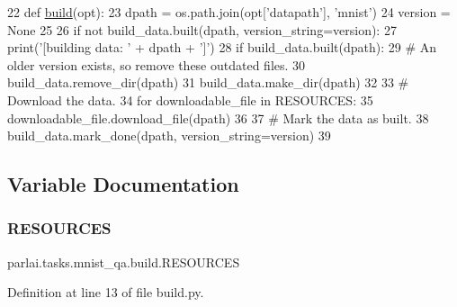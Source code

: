\begin{DoxyCode}
22 \textcolor{keyword}{def }\hyperlink{namespacedialog__babi__feedback_1_1build_a7a9d289f7493a5ded13c4b7f071b6184}{build}(opt):
23     dpath = os.path.join(opt[\textcolor{stringliteral}{'datapath'}], \textcolor{stringliteral}{'mnist'})
24     version = \textcolor{keywordtype}{None}
25 
26     \textcolor{keywordflow}{if} \textcolor{keywordflow}{not} build\_data.built(dpath, version\_string=version):
27         print(\textcolor{stringliteral}{'[building data: '} + dpath + \textcolor{stringliteral}{']'})
28         \textcolor{keywordflow}{if} build\_data.built(dpath):
29             \textcolor{comment}{# An older version exists, so remove these outdated files.}
30             build\_data.remove\_dir(dpath)
31         build\_data.make\_dir(dpath)
32 
33         \textcolor{comment}{# Download the data.}
34         \textcolor{keywordflow}{for} downloadable\_file \textcolor{keywordflow}{in} RESOURCES:
35             downloadable\_file.download\_file(dpath)
36 
37         \textcolor{comment}{# Mark the data as built.}
38         build\_data.mark\_done(dpath, version\_string=version)
39 \end{DoxyCode}


\subsection{Variable Documentation}
\mbox{\label{namespaceparlai_1_1tasks_1_1mnist__qa_1_1build_a4a925172348e79b08c74a079d215d1fc}} 
\subsubsection{\texorpdfstring{R\+E\+S\+O\+U\+R\+C\+ES}{RESOURCES}}
{\footnotesize\ttfamily parlai.\+tasks.\+mnist\+\_\+qa.\+build.\+R\+E\+S\+O\+U\+R\+C\+ES}



Definition at line 13 of file build.\+py.

